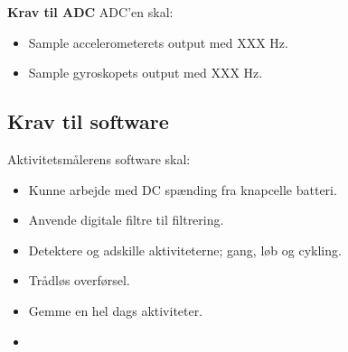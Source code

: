 \textbf{Krav til ADC} \newline
ADC'en skal:
\begin{itemize}
\item Sample accelerometerets output med XXX Hz.
\item Sample gyroskopets output med XXX Hz. 
\end{itemize}



\subsection{Krav til software}


Aktivitetsmålerens software skal:
\begin{itemize}
\item Kunne arbejde med DC spænding fra knapcelle batteri.
\item Anvende digitale filtre til filtrering.
\item Detektere og adskille aktiviteterne; gang, løb og cykling. 
\item Trådløs overførsel.
\item Gemme en hel dags aktiviteter. 
\item 
\end{itemize}
 


